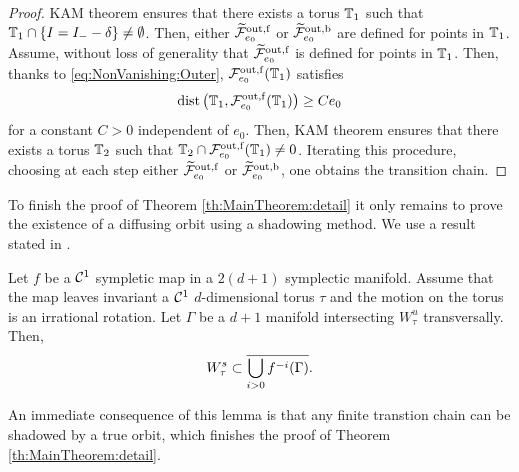 \begin{proof}
  KAM theorem  ensures that there exists a torus $\mathbb{T}_1$ such that
  $\mathbb{T}_1\cap \{I=I_--\delta\}\neq \emptyset$. Then, either $\widetilde{\mathcal{F}}_{e_0}^{\mathrm{out},\mathrm{f}}$ or $\widetilde{\mathcal{F}}_{e_0}^{\mathrm{out},\mathrm{b}}$ are defined for points in $\mathbb{T}_1$. Assume, without loss of generality that $\widetilde{\mathcal{F}}_{e_0}^{\mathrm{out},\mathrm{f}}$ is defined for points in $\mathbb{T}_1$. Then, thanks to \eqref{eq:NonVanishing:Outer},
  $\mathcal{F}_{e_0}^{\mathrm{out},\mathrm{f}}(\mathbb{T}_1)$ satisfies
  \[
  \mathrm{dist}\left(\mathbb{T}_1, \mathcal{F}_{e_0}^{\mathrm{out},\mathrm{f}}(\mathbb{T}_1)\right)\geq C e_0
  \]
  for a constant $C>0$ independent of $e_0$. Then, KAM theorem ensures that
  there exists a torus $\mathbb{T}_2$ such that $\mathbb{T}_2\cap \mathcal{F}_{e_0}^{\mathrm{out},\mathrm{f}}(\mathbb{T}_1)\neq 0$.
  Iterating this procedure, choosing at each step either $\widetilde{\mathcal{F}}_{e_0}^{\mathrm{out},\mathrm{f}}$ or $\widetilde{\mathcal{F}}_{e_0}^{\mathrm{out},\mathrm{b}}$, one obtains the transition chain.
\end{proof}




To finish the proof of Theorem \ref{th:MainTheorem:detail} it only remains to prove
the existence of a diffusing orbit using a shadowing method. We use a result stated in \cite{FontichM98}.

\begin{lemma}
  Let $f$ be a $\mathcal{C}^1$ sympletic map  in a $2(d+1)$ symplectic manifold.
  Assume that the map leaves invariant a $\mathcal{C}^1$ $d$-dimensional torus $\tau$
  and the motion on the torus is an irrational rotation. Let $\Gamma$ be a $d+1$ manifold
  intersecting $W_\tau^u$ transversally. Then,
  \[
  W_\tau^s\subset \overline{\bigcup_{i>0}f^{-i}(\Gamma)}.
  \]
\end{lemma}
An immediate consequence of this lemma is that any finite transtion chain can be shadowed
by a true orbit, which finishes the proof of Theorem \ref{th:MainTheorem:detail}. 